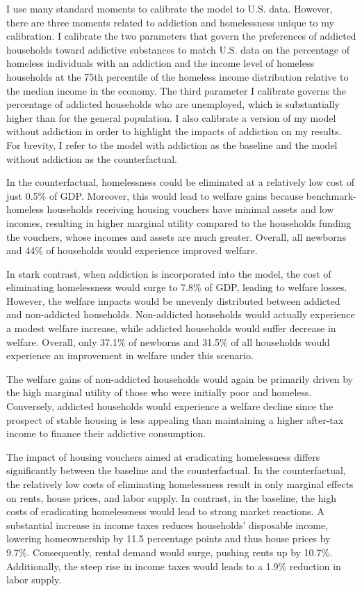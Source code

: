 \documentclass[parskip=full]{article}
\begin{document}
I use many standard moments to calibrate the model to U.S. data. However, there are three moments related to addiction and homelessness unique to my calibration. I calibrate the two parameters that govern the preferences of addicted households toward addictive substances to match U.S. data on the percentage of homeless individuals with an addiction and the income level of homeless households at the 75th percentile of the homeless income distribution relative to the median income in the economy. The third parameter I calibrate governs the percentage of addicted households who are unemployed, which is substantially higher than for the general population. I also calibrate a version of my model without addiction in order to highlight the impacts of addiction on my results. For brevity, I refer to the model with addiction as the baseline and the model without addiction as the counterfactual.

In the counterfactual, homelessness could be eliminated at a relatively low cost of just 0.5\% of GDP. Moreover, this would lead to welfare gains because benchmark-homeless households receiving housing vouchers have minimal assets and low incomes, resulting in higher marginal utility compared to the households funding the vouchers, whose incomes and assets are much greater. Overall, all newborns and 44\% of households would experience improved welfare.

In stark contrast, when addiction is incorporated into the model, the cost of eliminating homelessness would surge to 7.8\% of GDP, leading to welfare losses. However, the welfare impacts would be unevenly distributed between addicted and non-addicted households. Non-addicted households would actually experience a modest welfare increase, while addicted households would suffer decrease in welfare. Overall, only 37.1\% of newborns and 31.5\% of all households would experience an improvement in welfare under this scenario.

The welfare gains of non-addicted households would again be primarily driven by the high marginal utility of those who were initially poor and homeless. Conversely, addicted households would experience a welfare decline since the prospect of stable housing is less appealing than maintaining a higher after-tax income to finance their addictive consumption.

The impact of housing vouchers aimed at eradicating homelessness differs significantly between the baseline and the counterfactual. In the counterfactual, the relatively low costs of eliminating homelessness result in only marginal effects on rents, house prices, and labor supply. In contrast, in the baseline, the high costs of eradicating homelessness would lead to strong market reactions. A substantial increase in income taxes reduces households' disposable income, lowering homeownership by 11.5 percentage points and thus house prices by 9.7\%. Consequently, rental demand would surge, pushing rents up by 10.7\%. Additionally, the steep rise in income taxes would leads to a 1.9\% reduction in labor supply. 
\end{document}
